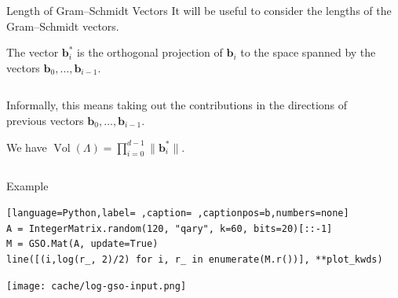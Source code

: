 \documentclass[table,10pt,aspectratio=169]{beamer}
\DeclareMathOperator{\Vol}{Vol}
\renewcommand{\vec}[1]{\ensuremath{\mathbf{#1}}\xspace}
\begin{document}
\begin{frame}[label={sec:org277e674}]{Length of Gram--Schmidt Vectors}
It will be useful to consider the lengths of the Gram--Schmidt vectors.

The vector \(\vec{b}^*_i\) is the orthogonal projection of \(\vec{b}_i\) to the space spanned by the vectors \(\vec{b}_0, \ldots, \vec{b}_{i-1}\).

\begin{columns}
\begin{column}{0.45\columnwidth}
\vspace{1em}

Informally, this means taking out the contributions in the directions of previous vectors  \(\vec{b}_0, \ldots, \vec{b}_{i-1}\).

\vspace{1em}

We have \(\Vol(\Lambda) = \prod_{i=0}^{d-1} \|\vec{b}_{i}^{*}\|\).
\end{column}

\begin{column}{0.45\columnwidth}
\end{column}
\end{columns}
\end{frame}

\begin{frame}[label={sec:orgbb2f521},fragile]{Example}
 \begin{lstlisting}[language=Python,label= ,caption= ,captionpos=b,numbers=none]
A = IntegerMatrix.random(120, "qary", k=60, bits=20)[::-1]
M = GSO.Mat(A, update=True)
line([(i,log(r_, 2)/2) for i, r_ in enumerate(M.r())], **plot_kwds)
\end{lstlisting}

\begin{center}
\texttt{[image: cache/log-gso-input.png]}
\end{center}
\end{frame}
\end{document}

